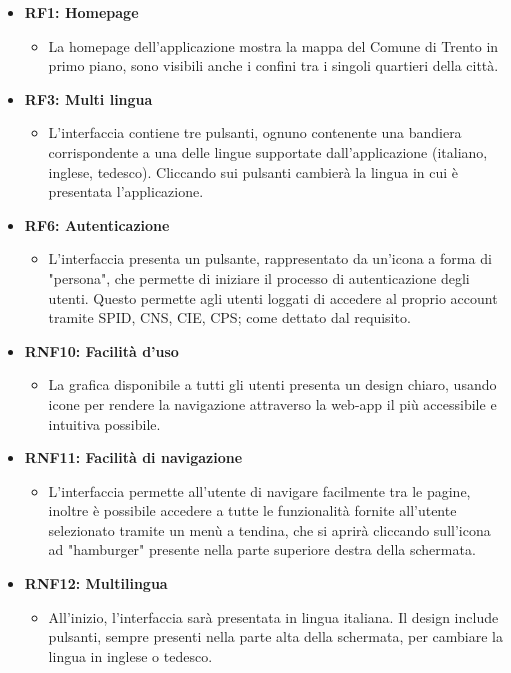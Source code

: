     \begin{itemize}
        \item \textbf{RF1: Homepage} \begin{itemize}
            \item La homepage dell'applicazione mostra la mappa del Comune di Trento in primo piano, sono visibili anche i confini tra i singoli quartieri della città.
        \end{itemize}
        \item \textbf{RF3: Multi lingua} \begin{itemize} 
                \item L'interfaccia contiene tre pulsanti, ognuno contenente una bandiera corrispondente a una delle lingue supportate dall'applicazione (italiano, inglese, tedesco). Cliccando sui pulsanti cambierà la lingua in cui è presentata l'applicazione.
        \end{itemize}
        \item \textbf{RF6: Autenticazione} \begin{itemize} 
            \item L'interfaccia presenta un pulsante, rappresentato da un'icona a forma di "persona", che permette di iniziare il processo di autenticazione degli utenti. Questo permette agli utenti loggati di accedere al proprio account tramite SPID, CNS, CIE, CPS; come dettato dal requisito.
        \end{itemize}
        \item \textbf{RNF10: Facilità d'uso} \begin{itemize}
                \item La grafica disponibile a tutti gli utenti presenta un design chiaro, usando icone per rendere la navigazione attraverso la web-app il più accessibile e intuitiva possibile.
        \end{itemize}
        \item \textbf{RNF11: Facilità di navigazione} \begin{itemize}
            \item L'interfaccia permette all'utente di navigare facilmente tra le pagine, inoltre è possibile accedere a tutte le funzionalità fornite all'utente selezionato tramite un menù a tendina, che si aprirà cliccando sull'icona ad "hamburger" presente nella parte superiore destra della schermata.
        \end{itemize}
        \item \textbf{RNF12: Multilingua} \begin{itemize} 
            \item All'inizio, l'interfaccia sarà presentata in lingua italiana. Il design include pulsanti, sempre presenti nella parte alta della schermata, per cambiare la lingua in inglese o tedesco.
        \end{itemize}
    \end{itemize}


